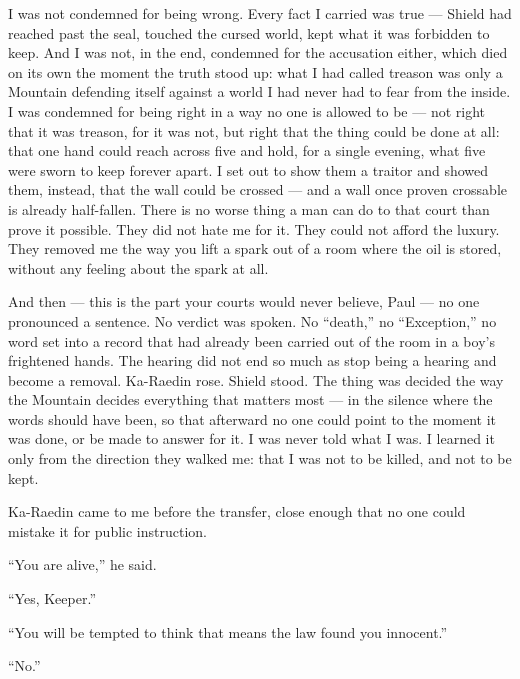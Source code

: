 I was not condemned for being wrong. Every fact I carried was true — Shield had reached past the seal, touched the cursed world, kept what it was forbidden to keep. And I was not, in the end, condemned for the accusation either, which died on its own the moment the truth stood up: what I had called treason was only a Mountain defending itself against a world I had never had to fear from the inside. I was condemned for being right in a way no one is allowed to be — not right that it was treason, for it was not, but right that the thing could be done at all: that one hand could reach across five and hold, for a single evening, what five were sworn to keep forever apart. I set out to show them a traitor and showed them, instead, that the wall could be crossed — and a wall once proven crossable is already half-fallen. There is no worse thing a man can do to that court than prove it possible. They did not hate me for it. They could not afford the luxury. They removed me the way you lift a spark out of a room where the oil is stored, without any feeling about the spark at all.\par
 
And then — this is the part your courts would never believe, Paul — no one pronounced a sentence. No verdict was spoken. No ``death,'' no ``Exception,'' no word set into a record that had already been carried out of the room in a boy's frightened hands. The hearing did not end so much as stop being a hearing and become a removal. Ka-Raedin rose. Shield stood. The thing was decided the way the Mountain decides everything that matters most — in the silence where the words should have been, so that afterward no one could point to the moment it was done, or be made to answer for it. I was never told what I was. I learned it only from the direction they walked me: that I was not to be killed, and not to be kept.\par
 
Ka-Raedin came to me before the transfer, close enough that no one could mistake it for public instruction.\par
 
``You are alive,'' he said.\par
 
``Yes, Keeper.''\par
 
``You will be tempted to think that means the law found you innocent.''\par
 
``No.''\par
 
